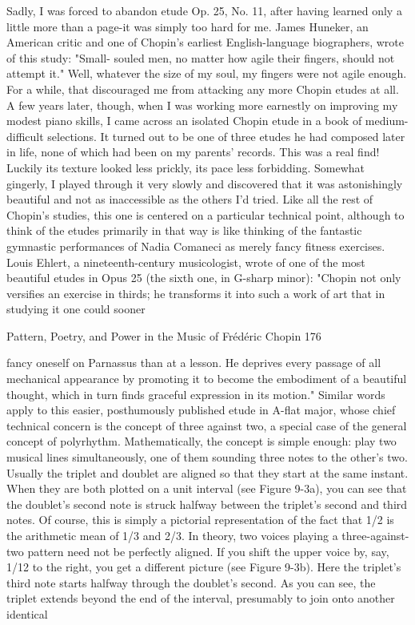         Sadly, I was forced to abandon etude Op. 25, No. 11, after having learned only a
little more than a page-it was simply too hard for me. James Huneker, an American critic
and one of Chopin's earliest English-language biographers, wrote of this study: "Small-
souled men, no matter how agile their fingers, should not attempt it." Well, whatever the
size of my soul, my fingers were not agile enough. For a while, that discouraged me from
attacking any more Chopin etudes at all. A few years later, though, when I was working
more earnestly on improving my modest piano skills, I came across an isolated Chopin
etude in a book of medium-difficult selections. It turned out to be one of three etudes he
had composed later in life, none of which had been on my parents' records. This was a
real find! Luckily its texture looked less prickly, its pace less forbidding. Somewhat
gingerly, I played through it very slowly and discovered that it was astonishingly
beautiful and not as inaccessible as the others I'd tried.
        Like all the rest of Chopin's studies, this one is centered on a particular technical
point, although to think of the etudes primarily in that way is like thinking of the fantastic
gymnastic performances of Nadia Comaneci as merely fancy fitness exercises. Louis
Ehlert, a nineteenth-century musicologist, wrote of one of the most beautiful etudes in
Opus 25 (the sixth one, in G-sharp minor): "Chopin not only versifies an exercise in
thirds; he transforms it into such a work of art that in studying it one could sooner




Pattern, Poetry, and Power in the Music of Frédéric Chopin                                176

fancy oneself on Parnassus than at a lesson. He deprives every passage of all mechanical
appearance by promoting it to become the embodiment of a beautiful thought, which in
turn finds graceful expression in its motion." Similar words apply to this easier,
posthumously published etude in A-flat major, whose chief technical concern is the
concept of three against two, a special case of the general concept of polyrhythm.
        Mathematically, the concept is simple enough: play two musical lines
simultaneously, one of them sounding three notes to the other's two. Usually the triplet
and doublet are aligned so that they start at the same instant. When they are both plotted
on a unit interval (see Figure 9-3a), you can see that the doublet's second note is struck
halfway between the triplet's second and third notes. Of course, this is simply a pictorial
representation of the fact that 1/2 is the arithmetic mean of 1/3 and 2/3.
        In theory, two voices playing a three-against-two pattern need not be perfectly
aligned. If you shift the upper voice by, say, 1/12 to the right, you get a different picture
(see Figure 9-3b). Here the triplet's third note starts halfway through the doublet's second.
As you can see, the triplet extends beyond the end of the interval, presumably to join onto
another identical

